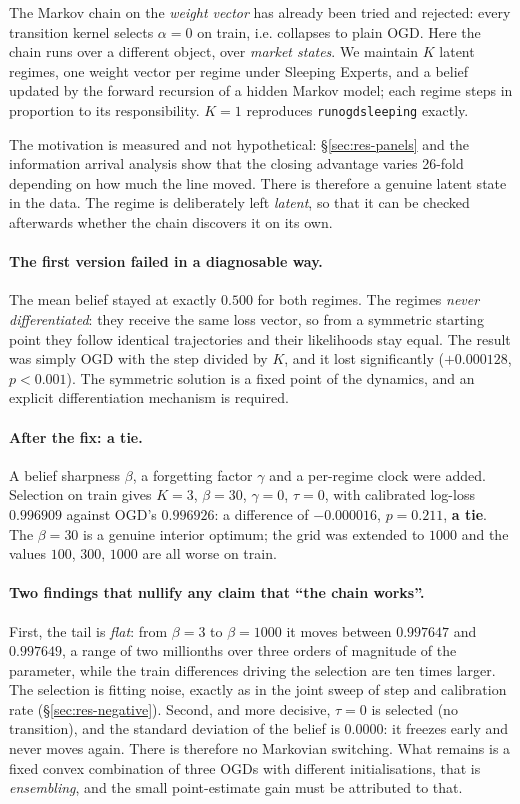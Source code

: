 \documentclass[12pt,a4paper,oneside]{report}
\newcommand{\file}[1]{\texttt{#1}}
\renewcommand{\_}{\oldunderscore\allowbreak}
\theoremstyle{definition}
\theoremstyle{plain}
\theoremstyle{remark}
\begin{document}
The Markov chain on the \emph{weight vector} has already been tried and rejected: every
transition kernel selects $\alpha=0$ on train, i.e. collapses to plain OGD. Here the chain runs
over a different object, over \emph{market states}. We maintain $K$ latent regimes, one weight
vector per regime under Sleeping Experts, and a belief updated by the forward recursion of a
hidden Markov model; each regime steps in proportion to its responsibility. $K=1$ reproduces
\file{run\_ogd\_sleeping} exactly.

The motivation is measured and not hypothetical: \S\ref{sec:res-panels} and the information
arrival analysis show that the closing advantage varies 26-fold depending on how much the line
moved. There is therefore a genuine latent state in the data. The regime is deliberately left
\emph{latent}, so that it can be checked afterwards whether the chain discovers it on its own.

\paragraph{The first version failed in a diagnosable way.} The mean belief stayed at exactly
$0.500$ for both regimes. The regimes \emph{never differentiated}: they receive the same loss
vector, so from a symmetric starting point they follow identical trajectories and their
likelihoods stay equal. The result was simply OGD with the step divided by $K$, and it lost
significantly ($+0.000128$, $p<0.001$). The symmetric solution is a fixed point of the dynamics,
and an explicit differentiation mechanism is required.

\paragraph{After the fix: a tie.} A belief sharpness $\beta$, a forgetting factor $\gamma$ and a
per-regime clock were added. Selection on train gives $K=3$, $\beta=30$, $\gamma=0$, $\tau=0$,
with calibrated log-loss $0.996909$ against OGD's $0.996926$: a difference of $-0.000016$,
$p=0.211$, \textbf{a tie}. The $\beta=30$ is a genuine interior optimum; the grid was extended
to $1000$ and the values $100$, $300$, $1000$ are all worse on train.

\paragraph{Two findings that nullify any claim that ``the chain works''.} First, the tail is
\emph{flat}: from $\beta=3$ to $\beta=1000$ it moves between $0.997647$ and $0.997649$, a range of
two millionths over three orders of magnitude of the parameter, while the train differences
driving the selection are ten times larger. The selection is fitting noise, exactly as in the
joint sweep of step and calibration rate (\S\ref{sec:res-negative}). Second, and more decisive,
$\tau=0$ is selected (no transition), and the standard deviation of the belief is $0.0000$: it
freezes early and never moves again. There is therefore no Markovian switching. What remains is
a fixed convex combination of three OGDs with different initialisations, that is
\emph{ensembling}, and the small point-estimate gain must be attributed to that.
\end{document}
